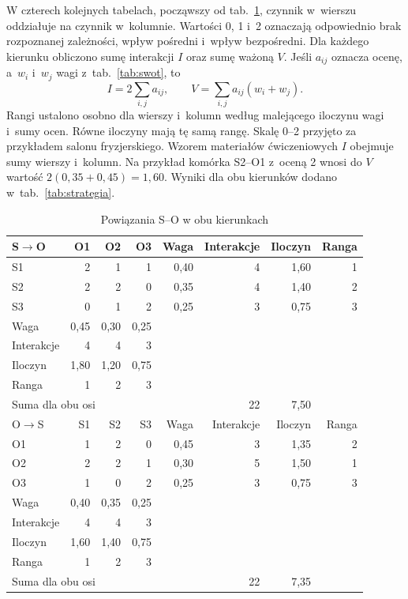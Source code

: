 \documentclass[12pt,a4paper,oneside]{article}
\begin{document}
W czterech kolejnych tabelach, począwszy od tab.~\ref{tab:macierze}, czynnik w~wierszu oddziałuje na czynnik w~kolumnie. Wartości 0, 1 i~2 oznaczają odpowiednio brak rozpoznanej zależności, wpływ pośredni i~wpływ bezpośredni. Dla każdego kierunku obliczono sumę interakcji $I$ oraz sumę ważoną $V$. Jeśli $a_{ij}$ oznacza ocenę, a~$w_i$ i~$w_j$ wagi z~tab.~\ref{tab:swot}, to
\[
 I=2\sum_{i,j}a_{ij},\qquad V=\sum_{i,j}a_{ij}(w_i+w_j).
\]
Rangi ustalono osobno dla wierszy i~kolumn według malejącego iloczynu wagi i~sumy ocen. Równe iloczyny mają tę samą rangę. Skalę 0--2 przyjęto za przykładem salonu fryzjerskiego. Wzorem materiałów ćwiczeniowych $I$ obejmuje sumy wierszy i~kolumn. Na przykład komórka S2--O1 z~oceną 2 wnosi do $V$ wartość $2(0{,}35+0{,}45)=1{,}60$. Wyniki dla obu kierunków dodano w~tab.~\ref{tab:strategia}.

\begin{table}[H]\centering\small\renewcommand{\arraystretch}{0.96}
\caption{Powiązania S--O w obu kierunkach}\label{tab:macierze}
\begin{tabular}{@{}lrrrrrrr@{}}\toprule
S$\to$O & O1 & O2 & O3 & Waga & Interakcje & Iloczyn & Ranga \\
\midrule
S1 & 2 & 1 & 1 & 0,40 & 4 & 1,60 & 1 \\
S2 & 2 & 2 & 0 & 0,35 & 4 & 1,40 & 2 \\
S3 & 0 & 1 & 2 & 0,25 & 3 & 0,75 & 3 \\
Waga & 0,45 & 0,30 & 0,25 &  &  &  &  \\
Interakcje & 4 & 4 & 3 &  &  &  &  \\
Iloczyn & 1,80 & 1,20 & 0,75 &  &  &  &  \\
Ranga & 1 & 2 & 3 &  &  &  &  \\
\multicolumn{5}{l}{Suma dla obu osi} & 22 & 7,50 &  \\
\midrule
O$\to$S & S1 & S2 & S3 & Waga & Interakcje & Iloczyn & Ranga \\
\midrule
O1 & 1 & 2 & 0 & 0,45 & 3 & 1,35 & 2 \\
O2 & 2 & 2 & 1 & 0,30 & 5 & 1,50 & 1 \\
O3 & 1 & 0 & 2 & 0,25 & 3 & 0,75 & 3 \\
Waga & 0,40 & 0,35 & 0,25 &  &  &  &  \\
Interakcje & 4 & 4 & 3 &  &  &  &  \\
Iloczyn & 1,60 & 1,40 & 0,75 &  &  &  &  \\
Ranga & 1 & 2 & 3 &  &  &  &  \\
\multicolumn{5}{l}{Suma dla obu osi} & 22 & 7,35 &  \\
\bottomrule
\end{tabular}\end{table}
\end{document}
